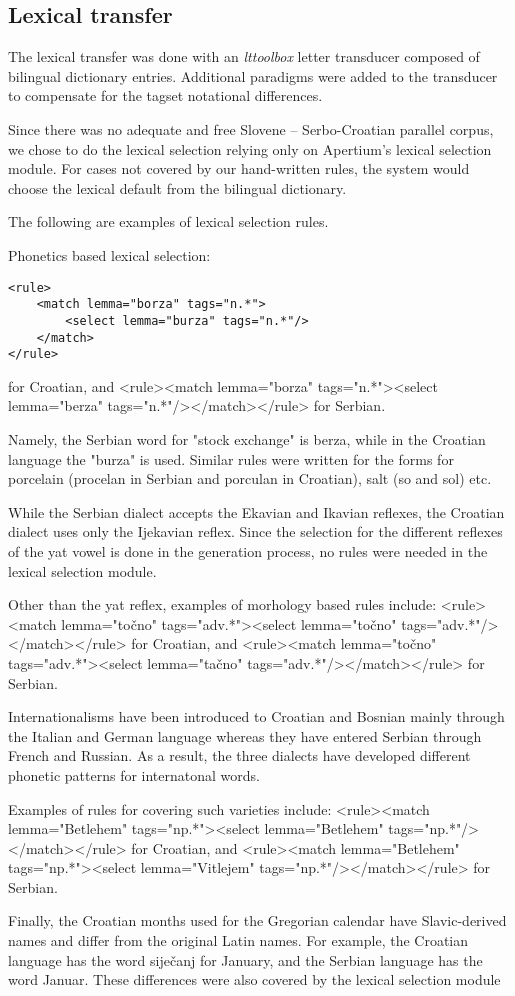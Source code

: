 \subsection{Lexical transfer}
The lexical transfer was done with an \emph{lttoolbox} letter
transducer composed of bilingual dictionary entries. Additional
paradigms were added to the transducer to compensate for the tagset
notational differences.

Since there was no adequate and free Slovene -- Serbo-Croatian parallel corpus, 
we chose to do the lexical selection relying only on Apertium's lexical selection module.
For cases not covered by our hand-written rules, the system would choose the lexical 
default from the bilingual dictionary.

The following are examples of lexical selection rules.

Phonetics based lexical selection:
{\small
\begin{Verbatim}
<rule>
    <match lemma="borza" tags="n.*">
        <select lemma="burza" tags="n.*"/>
    </match>
</rule>
\end{Verbatim}
}

for Croatian, and 
 <rule><match lemma="borza" tags="n.*"><select lemma="berza" tags="n.*"/></match></rule>
for Serbian.

Namely, the Serbian word for "stock exchange" is berza, while in the Croatian language the "burza" is used.
Similar rules were written for the forms for porcelain (procelan in Serbian and porculan in Croatian), 
salt (so and sol) etc.

While the Serbian dialect accepts the Ekavian and Ikavian reflexes, 
the Croatian dialect uses only the Ijekavian reflex.
Since the selection for the different reflexes of the yat vowel is done in the generation process,
no rules were needed in the lexical selection module.

Other than the yat reflex, examples of morhology based rules include:
 <rule><match lemma="točno" tags="adv.*"><select lemma="točno" tags="adv.*"/></match></rule>
for Croatian, and
 <rule><match lemma="točno" tags="adv.*"><select lemma="tačno" tags="adv.*"/></match></rule>
for Serbian.


Internationalisms have been introduced to Croatian and Bosnian mainly through the Italian and German language
whereas they have entered Serbian through French and Russian. 
As a result, the three dialects have developed different phonetic patterns for internatonal words.

Examples of rules for covering such varieties include:
 <rule><match lemma="Betlehem" tags="np.*"><select lemma="Betlehem" tags="np.*"/></match></rule>
for Croatian, and
 <rule><match lemma="Betlehem" tags="np.*"><select lemma="Vitlejem" tags="np.*"/></match></rule>
for Serbian.

Finally, the Croatian months used for the Gregorian calendar have Slavic-derived names and differ from the original Latin names.
For example, the Croatian language has the word siječanj for January, and 
the Serbian language has the word Januar.
These differences were also covered by the lexical selection module



